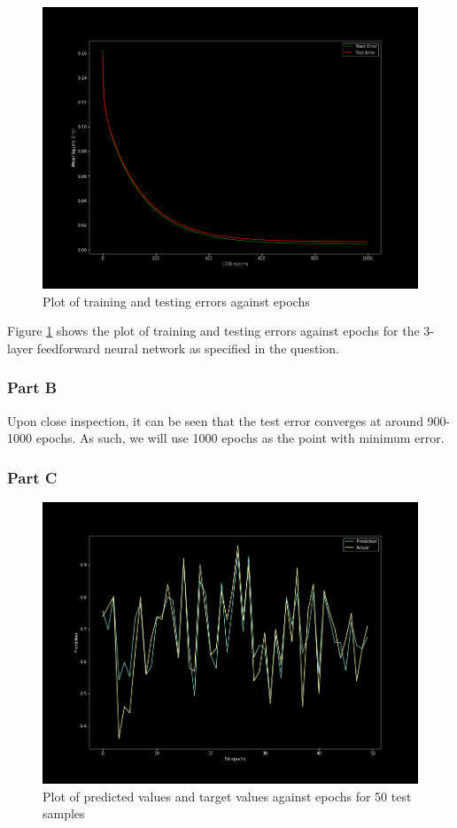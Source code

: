 \begin{figure}[H]
    \centering
    \includegraphics[width=0.8\linewidth]{assets/plots2/part2_Q1a.png}
    \caption{Plot of training and testing errors against epochs}
    \label{fig:2_1a}
\end{figure}

Figure \ref{fig:2_1a} shows the plot of training and testing errors against epochs for the 3-layer feedforward neural network as specified in the question.

\subsubsection{Part B}
Upon close inspection, it can be seen that the test error converges at around 900-1000 epochs. As such, we will use 1000 epochs as the point with minimum error.

\subsubsection{Part C}
\begin{figure}[H]
    \centering
    \includegraphics[width=0.8\linewidth]{assets/plots2/part2_Q1c.png}
    \caption{Plot of predicted values and target values against epochs for 50 test samples}
    \label{fig:2_1c}
\end{figure}

